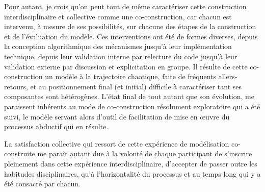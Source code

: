 Pour autant, je crois qu'on peut tout de même caractériser cette construction interdisciplinaire et collective comme une co-construction, car chacun est intervenu, à mesure de ses possibilités, sur chacune des étapes de la construction et de l'évaluation du modèle.
Ces interventions ont été de formes diverses, depuis la conception algorithmique des mécanismes jusqu'à leur implémentation technique, depuis leur validation interne par relecture du code jusqu'à leur validation externe par discussion et explicitation en groupe.
Il résulte de cette co-construction un modèle à la trajectoire chaotique, faite de fréquents allers-retours, et au positionnement final (et initial) difficile à caractériser tant ses composantes sont hétérogènes.
L'état \og final\fg{} de \simfeodal{} tout autant que son évolution, me paraissent inhérents au mode de co-construction résolument exploratoire qui a été suivi, le modèle servant alors d'outil de facilitation de mise en œuvre du processus abductif qui en résulte.

La satisfaction collective qui ressort de cette expérience de modélisation co-construite me paraît autant due à la volonté de chaque participant de s'inscrire pleinement dans cette expérience interdisciplinaire, d'accepter de passer outre les habitudes disciplinaires, qu'à l'horizontalité du processus et au temps long qui y a été consacré par chacun.

%

%

